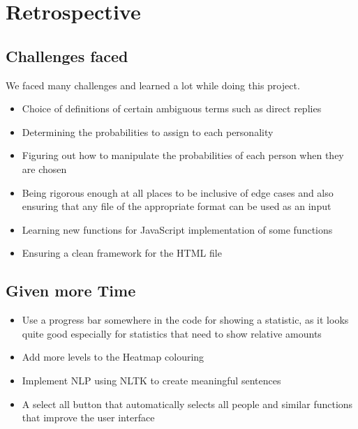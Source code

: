 \documentclass[12pt]{extarticle}
\begin{document}
\section{Retrospective}
\subsection{Challenges faced}
We faced many challenges and learned a lot while doing this project.
\begin{itemize}
    \item Choice of definitions of certain ambiguous terms such as direct replies
    \item Determining the probabilities to assign to each personality
    \item Figuring out how to manipulate the probabilities of each person when they are chosen
    \item Being rigorous enough at all places to be inclusive of edge cases and also ensuring that any file of the appropriate format can be used as an input
    \item Learning new functions for JavaScript implementation of some functions
    \item Ensuring a clean framework for the HTML file
\end{itemize}
\subsection{Given more Time}
\begin{itemize}
    \item Use a progress bar somewhere in the code for showing a statistic, as it looks quite good especially for statistics that need to show relative amounts
    \item Add more levels to the Heatmap colouring
    \item Implement NLP using NLTK to create meaningful sentences
    \item A select all button that automatically selects all people and similar functions that improve the user interface
\end{itemize}


\end{document}
